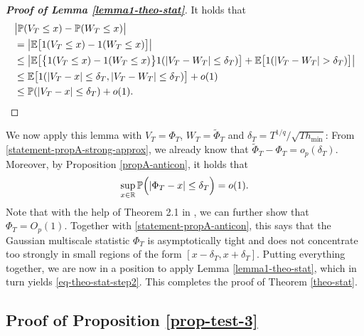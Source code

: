 \documentclass[a4paper,12pt]{article}
\numberwithin{equation}{section}
\begin{document}
\begin{proof}[\textnormal{\textbf{Proof of Lemma \ref{lemma1-theo-stat}}}] 
It holds that 
\begin{align*}
 & \big| \mathbb{P}(V_T \le x) - \mathbb{P}(W_T \le x) \big| \\
 & = \big| \mathbb{E} \big[ 1(V_T \le x) - 1(W_T \le x) \big] \big| \\
 & \le \big| \mathbb{E} \big[ \big\{ 1(V_T \le x) - 1(W_T \le x) \big\} 1(|V_T - W_T| \le \delta_T) \big] + \mathbb{E} \big[ 1(|V_T - W_T| > \delta_T) \big] \big| \\
 & \le \mathbb{E} \big[ 1(|V_T - x| \le \delta_T, |V_T - W_T| \le \delta_T) \big] + o(1) \\
 & \le \mathbb{P} (|V_T - x| \le \delta_T) + o(1). \qedhere
\end{align*}
\end{proof}
We now apply this lemma with $V_T = \Phi_T$, $W_T = \widetilde{\Phi}_T$ and $\delta_T = T^{1/q} / \sqrt{T h_{\min}}$: From \eqref{statement-propA-strong-approx}, we already know that $\widetilde{\Phi}_T - \Phi_T = o_p(\delta_T)$. Moreover, by Proposition \ref{propA-anticon}, it holds that 
\begin{equation}\label{statement-propA-anticon}
\sup_{x \in \mathbb{R}} \mathbb{P} \Big( | \Phi_T - x | \le \delta_T \Big) = o(1). 
\end{equation}
Note that with the help of Theorem 2.1 in \cite{DuembgenSpokoiny2001}, we can further show that $\Phi_T = O_p(1)$. Together with \eqref{statement-propA-anticon}, this says that the Gaussian multiscale statistic $\Phi_T$ is asymptotically tight and does not concentrate too strongly in small regions of the form $[x - \delta_T,x + \delta_T]$. Putting everything together, we are now in a position to apply Lemma \ref{lemma1-theo-stat}, which in turn yields \eqref{eq-theo-stat-step2}. This completes the proof of Theorem \ref{theo-stat}. 



\subsection*{Proof of Proposition \ref{prop-test-3}}
\end{document}
